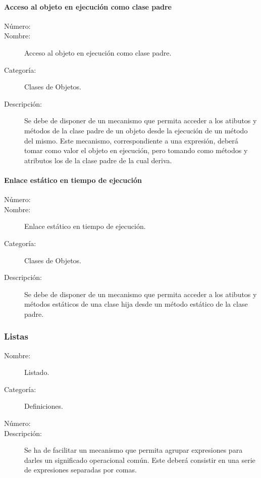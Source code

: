 \paragraph{Acceso al objeto en ejecución como clase padre}
\begin{framed}
	\begin{description}
		\item [Número:] \cn
		\item [Nombre:] Acceso al objeto en ejecución como clase padre.
		\item [Categoría:] Clases de Objetos.
		\item [Descripción:] Se debe de disponer de un mecanismo que permita acceder a los atibutos y métodos de la clase padre de un objeto desde 
      la ejecución de un método del mismo. Este mecanismo, correspondiente a una expresión, deberá tomar como valor el objeto en ejecución, pero tomando
      como métodos y atributos los de la clase padre de la cual deriva. 
	\end{description}
\end{framed}

\paragraph{Enlace estático en tiempo de ejecución}
\begin{framed}
	\begin{description}
		\item [Número:] \cn
		\item [Nombre:] Enlace estático en tiempo de ejecución.
		\item [Categoría:] Clases de Objetos.
		\item [Descripción:] Se debe de disponer de un mecanismo que permita acceder a los atibutos y métodos estáticos de una clase hija desde un método 
      estático de la clase padre. 
	\end{description}
\end{framed}




\subsubsection{Listas}

\begin{framed}
	\begin{description}
		\item [Nombre:] Listado.
		\item [Categoría:] Definiciones.
		\item [Número:] \cn
		\item [Descripción:] Se ha de facilitar un mecanismo que permita agrupar expresiones para darles un significado operacional
		común. Este deberá consistir en una serie de expresiones separadas por comas.
	\end {description}
\end{framed}

